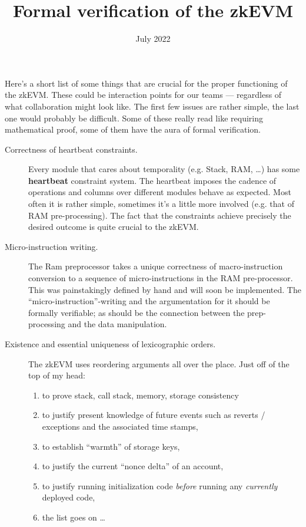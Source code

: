 \documentclass{article}
\title{Formal verification of the zkEVM}
\author{\arithmetizationTeam{}}
\date{July 2022}
\begin{document}
\maketitle
\tableofcontents

Here's a short list of some things that are crucial for the proper functioning of the zkEVM. These could be interaction points for our teams --- regardless of what collaboration might look like. The first few issues are rather simple, the last one would probably be difficult. Some of these really read like requiring mathematical proof, some of them have the aura of formal verification.
\begin{description}
	\item[Correctness of heartbeat constraints.] Every module that cares about temporality (e.g. Stack, RAM, \dots{}) has some \textbf{heartbeat} constraint system. The heartbeat imposes the cadence of operations and columns over different modules behave as expected. Most often it is rather simple, sometimes it's a little more involved (e.g. that of RAM pre-processing). The fact that the constraints achieve precisely the desired outcome is quite crucial to the zkEVM.
	\item[Micro-instruction writing.] The Ram preprocessor takes a unique correctness of macro-instruction conversion to a sequence of micro-instructions in the RAM pre-processor. This was painstakingly defined by hand and will soon be implemented. The ``micro-instruction''-writing and the argumentation for it should be formally verifiable; as should be the connection between the prep-processing and the data manipulation. 
	\item[Existence and essential uniqueness of lexicographic orders.] The zkEVM uses reordering arguments all over the place. Just off of the top of my head:
	\begin{enumerate}
		\item to prove stack, call stack, memory, storage consistency
		\item to justify present knowledge of future events such as reverts / exceptions and the associated time stamps,
		\item to establish ``warmth'' of storage keys,
		\item to justify the current ``nonce delta'' of an account,
		\item to justify running initialization code \emph{before} running any \emph{currently} deployed code,
		\item the list goes on \dots{}
	\end{enumerate}

\end{description}
\end{document}
